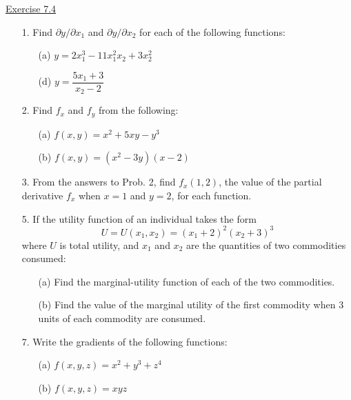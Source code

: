 \underline{Exercise 7.4}
\begin{enumerate}
\item[1.] Find $\partial y / \partial x_{1}$ and $\partial y / \partial x_{2}$ for each of the following functions:
\begin{enumerate}
\item[(a)] $y=2x_{1}^{3}-11x_{1}^{2}x_{2}+3x_{2}^{2}$
\item[(d)] $y=\dfrac{5x_{1}+3}{x_{2}-2}$
\end{enumerate}

\item[2.] Find $f_{x}$ and $f_{y}$ from the following:
\begin{enumerate}
\item[(a)] $f(x,y)=x^{2}+5xy-y^{3}$
\item[(b)] $f(x,y)=\left(x^{2}-3y\right)(x-2)$
\end{enumerate}

\item[3.] From the answers to Prob. 2, find $f_{x}(1,2)$, the value of the partial derivative $f_{x}$ when $x=1$ and $y=2$, for each function.

\item[5.] If the utility function of an individual takes the form
\[U=U\left(x_{1},x_{2}\right)=\left(x_{1}+2\right)^{2}\left(x_{2}+3\right)^{3}\]
where $U$ is total utility, and $x_{1}$ and $x_{2}$ are the quantities of two commodities consumed:
\begin{enumerate}
\item[(a)] Find the marginal-utility function of each of the two commodities.
\item[(b)] Find the value of the marginal utility of the first commodity when 3 units of each commodity are consumed.
\end{enumerate}

\item[7.] Write the gradients of the following functions:
\begin{enumerate}
\item[(a)] $f(x,y,z)=x^{2}+y^{3}+z^{4}$
\item[(b)] $f(x,y,z)=xyz$
\end{enumerate}

\end{enumerate}


